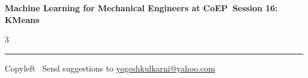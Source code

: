 \documentclass[8pt,landscape]{article}
\begin{document}
\footnotesize

\begin{center}
\Large{\textbf{Machine Learning for Mechanical Engineers at CoEP\ Session 16: KMeans}}
\end{center}

\begin{multicols}{3}

\end{multicols}

\rule{\linewidth}{0.25pt}
\scriptsize
Copyleft \textcopyleft\  Send suggestions to
\href{http://www.yogeshkulkarni.com}{yogeshkulkarni@yahoo.com}
\end{document}
